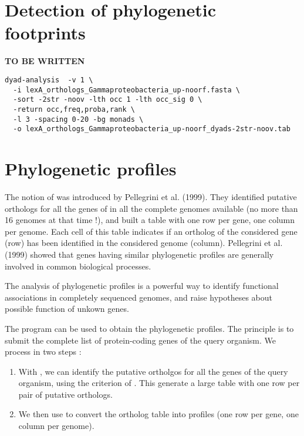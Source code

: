 \section{Detection of phylogenetic footprints}

\textbf{TO BE WRITTEN}

\begin{footnotesize}
\begin{verbatim}
dyad-analysis  -v 1 \
  -i lexA_orthologs_Gammaproteobacteria_up-noorf.fasta \
  -sort -2str -noov -lth occ 1 -lth occ_sig 0 \
  -return occ,freq,proba,rank \
  -l 3 -spacing 0-20 -bg monads \
  -o lexA_orthologs_Gammaproteobacteria_up-noorf_dyads-2str-noov.tab
\end{verbatim}
\end{footnotesize}

\section{Phylogenetic profiles}

The notion of  was introduced by
Pellegrini et al. (1999). They identified putative orthologs for all
the genes of  in all the complete genomes
available (no more than 16 genomes at that time !), and built a table
with one row per gene, one column per genome. Each cell of this table
indicates if an ortholog of the considered gene (row) has been
identified in the considered genome (column). Pellegrini et al. (1999)
showed that genes having similar phylogenetic profiles are generally
involved in common biological processes. 

The analysis of phylogenetic profiles is a powerful way to identify
functional associations in completely sequenced genomes, and raise
hypotheses about possible function of unkown genes.

The program  can be used to obtain the
phylogenetic profiles. The principle is to submit the complete list of
protein-coding genes of the query organism. We process in two steps : 

\begin{enumerate}

\item With \program{get-orthologs}, we can identify the putative
  ortholgos for all the genes of the query organism, using the
  criterion of . This generate a
  large table with one row per pair of putative orthologs.

\item We then use \program{convert-classes} to convert the ortholog
  table into profiles (one row per gene, one column per genome).

\end{enumerate}

